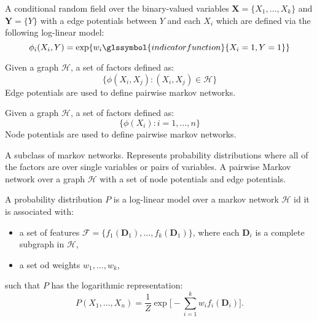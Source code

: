 {%
  A \gls{conditional random field} over the binary-valued variables $\bm{X}=\{X_1,\dots,X_k\}$ and $\bm{Y}=\{Y\}$ with a \glspl{edge potential} between $Y$ and each $X_i$ which are defined via the following \gls{log-linear model}:
  \begin{equation*}
    \phi_i(X_i,Y)=\exp\{ w_i \glssymbol{indicator function} \{ X_i=1,Y=1\}\}
  \end{equation*}
}

{%
  Given a \gls{graph} $\mathcal{H}$, a set of \glspl{factor} defined as:
  \begin{equation*}
    \{\phi(X_i,X_j):(X_i,X_j)\in\mathcal{H}\}
  \end{equation*}
  Edge potentials are used to define \glspl{pairwise markov network}.

}

{%
  Given a \gls{graph} $\mathcal{H}$, a set of \glspl{factor} defined as:
  \begin{equation*}
    \{\phi(X_i):i=1,\dots,n\}
  \end{equation*}
  Node potentials are used to define \glspl{pairwise markov network}.
}

{%
  A subclass of \glspl{markov network}. Represents \glspl{probability distribution} where all of the \glspl{factor} are over single variables or pairs of variables. A pairwise Markov network over a graph $\mathcal{H}$ with a set of \glspl{node potential} and \glspl{edge potential}.
}

{%
  A \gls{probability distribution} $P$ is a log-linear model over a \gls{markov network} $\mathcal{H}$ id it is associated with:
  \begin{itemize}
    \item a set of \glspl{feature} $\mathcal{F}=\{f_1(\bm{D}_1),\dots,f_k(\bm{D}_1)\}$, where each $\bm{D}_i$ is a \gls{complete subgraph} in $\mathcal{H}$,
    \item a set od weights $w_1,\dots,w_k$,
  \end{itemize}
  such that $P$ has the \gls{logarithmic representation}:
  \begin{equation*}
    P(X_1,\dots,X_n)=\frac{1}{Z}\exp \Bigg[ -\sum_{i=1}^k w_i f_i(\bm{D}_i) \Bigg] .
  \end{equation*}
}

